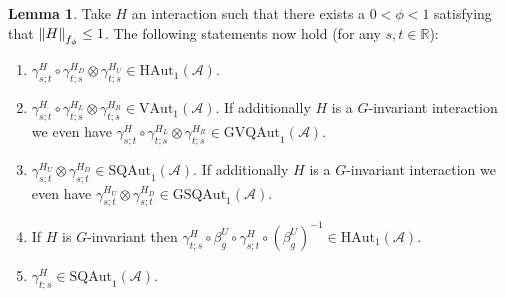 \documentclass[12pt,a4paper,twoside]{article}
\renewcommand{\AA}{\mathcal A}
\newcommand{\RR}{\mathbb R}
\theoremstyle{definition}
\newtheorem{lemma}[theorem]{Lemma}
\numberwithin{equation}{section}
\begin{document}
\begin{lemma}\label{lem:PropertiesLocallyGeneratedAutomorphisms}
	Take $H$ an interaction such that there exists a $0<\phi<1$ satisfying that $\norm{H}_{f_\phi}\leq 1$. The following statements now hold (for any $s,t\in\RR$):
	\begin{enumerate}
		\item $\gamma^H_{s;t}\circ\gamma^{H_D}_{t;s}\otimes\gamma^{H_U}_{t;s}\in\textrm{HAut}_1(\AA)$.
		\item $\gamma^H_{s;t}\circ\gamma^{H_L}_{t;s}\otimes\gamma^{H_R}_{t;s}\in\textrm{VAut}_1(\AA)$. If additionally $H$ is a $G$-invariant interaction we even have $\gamma^H_{s;t}\circ\gamma^{H_L}_{t;s}\otimes\gamma^{H_R}_{t;s}\in\textrm{GVQAut}_1(\AA)$.
		\item $\gamma^{H_U}_{s;t}\otimes\gamma^{H_D}_{s;t}\in\textrm{SQAut}_1(\AA)$. If additionally $H$ is a $G$-invariant interaction we even have $\gamma^{H_U}_{s;t}\otimes\gamma^{H_D}_{s;t}\in\textrm{GSQAut}_1(\AA)$.
		\item If $H$ is $G$-invariant then $\gamma^{H}_{t;s}\circ\beta_g^U\circ\gamma^{H}_{s;t}\circ(\beta_g^U)^{-1}\in\textrm{HAut}_1(\AA)$.
		\item $\gamma^{H}_{t;s}\in\textrm{SQAut}_1(\AA)$.
	\end{enumerate}
\end{lemma}
\end{document}
